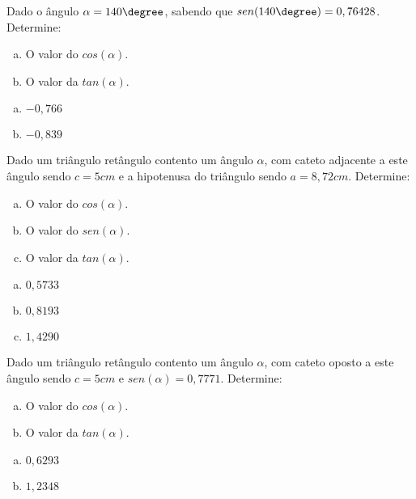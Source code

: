  \begin{exer}
 Dado o ângulo $\alpha= 140\degree$, sabendo que $sen(140\degree)= 0,76428$. Determine:
 \begin{enumerate}[a)]
 \item O valor do $cos(\alpha)$.
 \item O valor da $tan(\alpha)$.
 \end{enumerate}
 \end{exer}
\begin{resp}
\begin{multicols}{2}
  \begin{enumerate}[a)]
 \item $-0,766$
 \item $-0,839$
 \end{enumerate}
 \end{multicols}
\end{resp}
 
 \begin{exer}
 Dado um triângulo retângulo contento um ângulo $\alpha$, com cateto adjacente a este ângulo sendo $c= 5 cm$ e a hipotenusa do triângulo sendo $a= 8,72 cm$. Determine:
 \begin{enumerate}[a)]
 \item O valor do $cos(\alpha)$.
 \item O valor do $sen(\alpha)$.
 \item O valor da $tan(\alpha)$.
 \end{enumerate}
 \end{exer}
\begin{resp}
\begin{multicols}{3}
  \begin{enumerate}[a)]
 \item $0,5733$
 \item $0,8193$
 \item $1,4290$
 \end{enumerate}
 \end{multicols}
\end{resp}

 \begin{exer}
 Dado um triângulo retângulo contento um ângulo $\alpha$, com cateto oposto a este ângulo sendo $c= 5 cm$ e $sen(\alpha)= 0,7771$. Determine:
 \begin{enumerate}[a)]
 \item O valor do $cos(\alpha)$.
 \item O valor da $tan(\alpha)$.
 \end{enumerate}
 \end{exer}
\begin{resp}
\begin{multicols}{2}
  \begin{enumerate}[a)]
 \item $0,6293$
 \item $1,2348$
 \end{enumerate}
 \end{multicols}
\end{resp}

